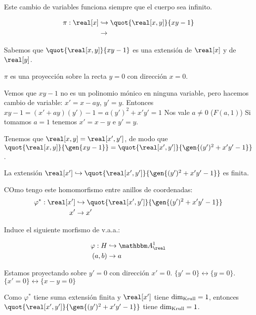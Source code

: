 Este cambio de variables funciona siempre que el cuerpo sea infinito.

\begin{example}
	
	\begin{align*}
	\pi: \real[x] & \hookrightarrow 	\quot{\real[x,y]}{xy-1}\\
		& \rightarrow
	\end{align*}
	
	Sabemos que $\quot{\real[x,y]}{xy-1}$ es una extensión de $\real[x]$ y de $\real[y]$.

	$\pi$ es una proyección sobre la recta $y=0$ con dirección $x=0$.
	
	Vemos que $xy-1$ no es un polinomio mónico en ninguna variable, pero hacemos cambio de variable:
	$x'=x-ay$, $y'=y$. Entonces $xy-1=(x'+ay)(y')-1=a(y')^2+x'y'=1$ Nos vale $a \neq 0$ ($F(a,1)$) Si tomamos $a=1$ tenemos $x'=x-y$ e $y'=y$.
	
	Tenemos que $\real[x,y]=\real[x',y']$, de modo que $\quot{\real[x,y]}{\gen{xy-1}}=\quot{\real[x',y']}{\gen{(y')^2+x'y'-1}}$.
	
	La extensión $\real[x'] \hookrightarrow \quot{\real[x',y']}{\gen{(y')^2+x'y'-1}}$ es finita.
	
	COmo tengo este homomorfismo entre anillos de coordenadas:
	\begin{align*}
		\varphi^*: \real[x'] & \hookrightarrow 	\quot{\real[x',y']}{\gen{(y')^2+x'y'-1}}\\
		x'	& \rightarrow x'
	\end{align*}
	
	Induce el siguiente morfismo de v.a.a.:
	
	\begin{align*}
		\varphi: H & \hookrightarrow 	\A^1_{\real}\\
		(a,b) & \rightarrow a
	\end{align*}
	
	Estamos proyectando sobre $y'=0$ con dirección $x'=0$. $\{y'=0\} \leftrightarrow \{ y=0 \}$. $\{x'=0\} \leftrightarrow \{ x-y=0 \}$
	
	Como $\varphi^*$ tiene suma extensión finita y $\real[x']$ tiene $\dim_{\mathrm{Krull}}=1$, entonces $\quot{\real[x',y']}{\gen{(y')^2+x'y'-1}}$ tiene $\dim_{\mathrm{Krull}}=1$.
\end{example}

